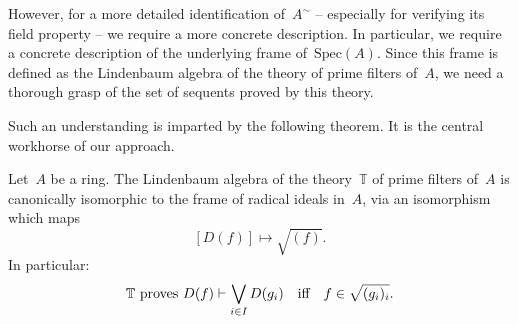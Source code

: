 \documentclass{ws-rv9x6}
\newcommand{\TT}{\mathbb{T}}
\newcommand{\Spec}{\mathrm{Spec}}
\renewcommand{\_}{\mathpunct{.}}
\newcommand{\?}{\,{:}\,}
\begin{document}
However, for a more detailed identification of~$A^\sim$ -- especially for
verifying its field property -- we require a more concrete description. In
particular, we require a concrete description of the underlying frame
of~$\Spec(A)$. Since this frame is defined as the Lindenbaum algebra of the
theory of prime filters of~$A$, we need a thorough grasp of the set of sequents proved by
this theory.

Such an understanding is imparted by the following theorem. It is the
central workhorse of our approach.

\begin{theorem}\label{thm:workhorse}
Let~$A$ be a ring. The Lindenbaum algebra of the theory~$\TT$ of prime filters
of~$A$ is canonically isomorphic to the frame of radical ideals in~$A$, via an
isomorphism which maps
\[ [D(f)] \longmapsto \sqrt{(f)}. \]
In particular:
\[
  \textnormal{$\TT$ proves~$D(f) \vdash \bigvee_{i \in I} D(g_i)$} \quad\text{iff}\quad
    f \in \sqrt{(g_i)_i}. \]
\end{theorem}
\end{document}
